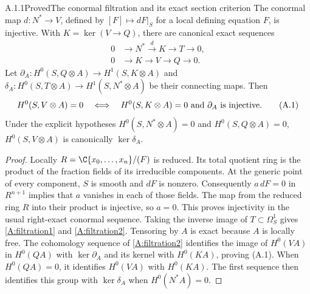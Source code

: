 
\begin{statement}{A.1.1}{Proved}{The conormal filtration and its exact section criterion}
The conormal map $d:N^*\to V$, defined by $[F]\mapsto dF|_S$ for a local defining equation $F$, is injective. With $K=\ker(V\to Q)$, there are canonical exact sequences
\begin{align}
0&\longrightarrow N^*\xrightarrow{d}K\longrightarrow T\longrightarrow0,
\label{A:filtration1}\\
0&\longrightarrow K\longrightarrow V\longrightarrow Q\longrightarrow0.
\label{A:filtration2}
\end{align}
Let $\partial_A:H^0(S,Q\otimes A)\to H^1(S,K\otimes A)$ and $\delta_A:H^0(S,T\otimes A)\to H^1(S,N^*\otimes A)$ be their connecting maps. Then
\[
 H^0(S,V\otimes A)=0
 \quad\Longleftrightarrow\quad
 H^0(S,K\otimes A)=0\ \hbox{and}\ \partial_A\hbox{ is injective}.
\tag{A.1}
\]
Under the explicit hypotheses $H^0(S,N^*\otimes A)=0$ and $H^0(S,Q\otimes A)=0$, $H^0(S,V\otimes A)$ is canonically $\ker\delta_A$.
\end{statement}
\begin{proof}
Locally $R=\C\{x_0,\ldots,x_n\}/(F)$ is reduced. Its total quotient ring is the product of the fraction fields of its irreducible components. At the generic point of every component, $S$ is smooth and $dF$ is nonzero. Consequently $a\,dF=0$ in $R^{n+1}$ implies that $a$ vanishes in each of those fields. The map from the reduced ring $R$ into their product is injective, so $a=0$. This proves injectivity in the usual right-exact conormal sequence. Taking the inverse image of $T\subset\Omega_S^1$ gives \eqref{A:filtration1} and \eqref{A:filtration2}. Tensoring by $A$ is exact because $A$ is locally free. The cohomology sequence of \eqref{A:filtration2} identifies the image of $H^0(VA)$ in $H^0(QA)$ with $\ker\partial_A$ and its kernel with $H^0(KA)$, proving (A.1). When $H^0(QA)=0$, it identifies $H^0(VA)$ with $H^0(KA)$. The first sequence then identifies this group with $\ker\delta_A$ when $H^0(N^*A)=0$.
\end{proof}

